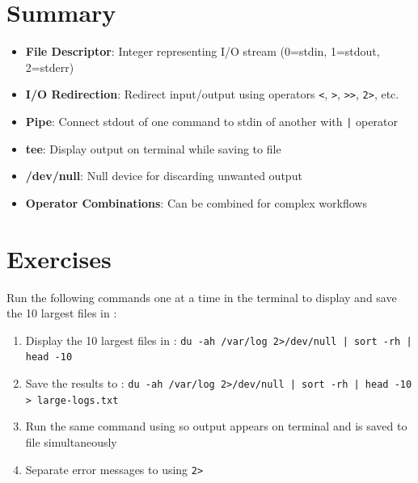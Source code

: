 \section{Summary}
\label{sec:io-summary}

\begin{itemize}
	\item \textbf{File Descriptor}: Integer representing I/O stream (0=stdin, 1=stdout, 2=stderr)

	\item \textbf{I/O Redirection}: Redirect input/output using operators \texttt{<}, \texttt{>}, \texttt{>>}, \texttt{2>}, etc.

	\item \textbf{Pipe}: Connect stdout of one command to stdin of another with \texttt{|} operator

	\item \textbf{tee}: Display output on terminal while saving to file

	\item \textbf{/dev/null}: Null device for discarding unwanted output

	\item \textbf{Operator Combinations}: Can be combined for complex workflows
\end{itemize}

\section{Exercises}
\label{sec:io-exercises}

\begin{exercisebox}[3.1]
	Run the following commands one at a time in the terminal to display and save the 10 largest files in :
	\begin{enumerate}
		\item Display the 10 largest files in : \texttt{du -ah /var/log 2>/dev/null | sort -rh | head -10}
		\item Save the results to : \texttt{du -ah /var/log 2>/dev/null | sort -rh | head -10 > large-logs.txt}
		\item Run the same command using  so output appears on terminal and is saved to file simultaneously
		\item Separate error messages to  using \texttt{2>}
	\end{enumerate}
\end{exercisebox}

